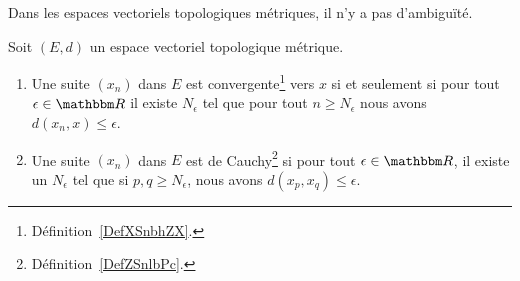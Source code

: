 Dans les espaces vectoriels topologiques métriques, il n'y a pas d'ambiguïté.
\begin{proposition}     \label{PropooUEEOooLeIImr}
    Soit \( (E,d)\) un espace vectoriel topologique métrique.
    \begin{enumerate}
        \item   \label{ItemooROYMooAQCXnj}
            Une suite \( (x_n)\) dans \( E\) est convergente\footnote{Définition~\ref{DefXSnbhZX}.} vers \( x\) si et seulement si pour tout \( \epsilon\in \eR\) il existe \( N_{\epsilon}\) tel que pour tout \( n\geq N_{\epsilon}\) nous avons \( d(x_n,x)\leq \epsilon\).
        \item
            Une suite \( (x_n)\) dans \( E\) est de Cauchy\footnote{Définition~\ref{DefZSnlbPc}.} si pour tout \( \epsilon\in \eR\), il existe un \( N_{\epsilon}\) tel que si \( p,q\geq N_{\epsilon}\), nous avons \( d(x_p,x_q)\leq \epsilon\).
    \end{enumerate}
\end{proposition}

